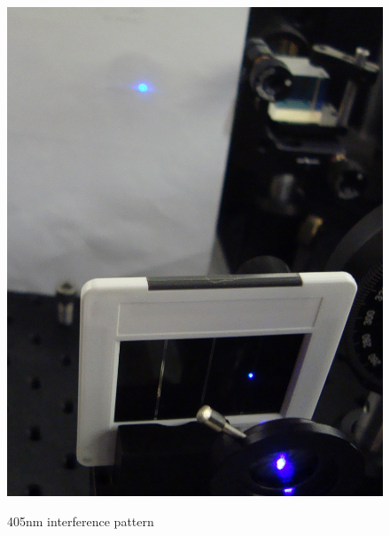 \documentclass{../lab}
\begin{document}
\begin{figure}[H]
  \href{http://experimentationlab.berkeley.edu/sites/default/files/images/Qe_405interference.jpeg}{\includegraphics[width=\linewidth,keepaspectratio]{images/Qe_405interference.jpeg}}
  \caption{405nm interference pattern}
  \label{fig:Qe_405interference.jpeg}
\endminipage
\end{figure}
\end{document}
